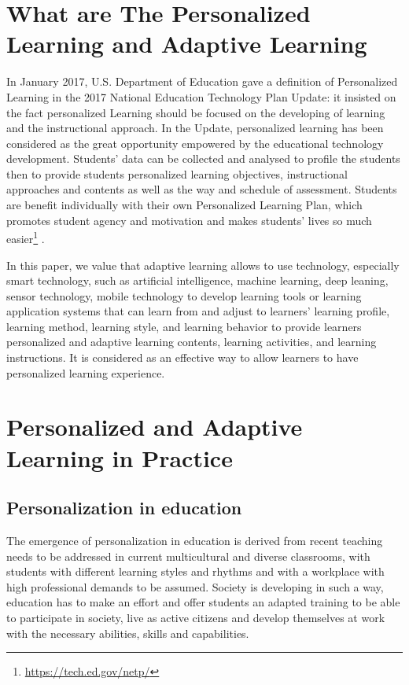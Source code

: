 \documentclass[english]{textolivre}
\begin{document}
\section{What are The Personalized Learning and Adaptive Learning}\label{sec-2}
In January 2017, U.S. Department of Education gave a definition of Personalized Learning in the 2017 National Education Technology Plan Update: it insisted on the fact personalized Learning should be focused on the developing of learning and the instructional approach. In the Update, personalized learning has been considered as the great opportunity empowered by the educational technology development. Students’ data can be collected and analysed to profile the students then to provide students personalized learning objectives, instructional approaches and contents as well as the way and schedule of assessment. Students are benefit individually with their own Personalized Learning Plan, which promotes student agency and motivation and makes students’ lives so much easier\footnote{\url{https://tech.ed.gov/netp/}} \cite{u.s._department_of_education_national_2017}.

In this paper, we value that adaptive learning allows to use technology, especially smart technology, such as artificial intelligence, machine learning, deep leaning, sensor technology, mobile technology to develop learning tools or learning application systems that can learn from and adjust to learners’ learning profile, learning method, learning style, and learning behavior to provide learners personalized and adaptive learning contents, learning activities, and learning instructions. It is considered as an effective way to allow learners to have personalized learning experience.

\section{Personalized and Adaptive Learning in Practice}\label{sec-3}
\subsection{Personalization in education}
The emergence of personalization in education is derived from recent teaching needs to be addressed in current multicultural and diverse classrooms, with students with different learning styles and rhythms and with a workplace with high professional demands to be assumed. Society is developing in such a way, education has to make an effort and offer students an adapted training to be able to participate in society, live as active citizens and develop themselves at work with the necessary abilities, skills and capabilities.
\end{document}
